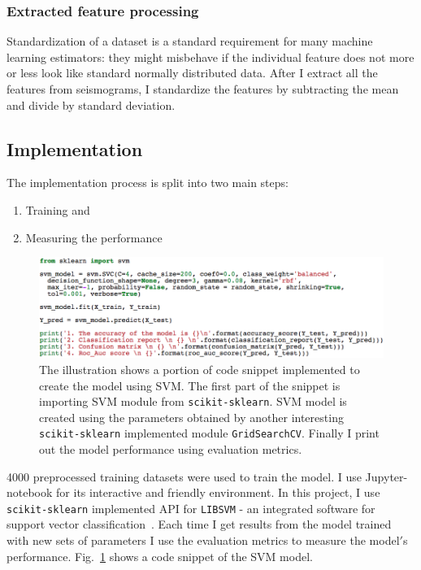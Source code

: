 \documentclass[12pt]{article}
\begin{document}
        \subsubsection{Extracted feature processing}
        Standardization of a dataset is a standard requirement for many machine learning estimators: they might misbehave if the individual feature does not more or less look like standard normally distributed data. After I extract all the features from seismograms, I standardize the features by subtracting the mean and divide by standard deviation.
        
        \subsection{Implementation}
        The implementation process is split into two main steps:
        \begin{enumerate}
            \item Training and 
            \item Measuring the performance
        \end{enumerate}
    
        \begin{figure}[!htb]
            \begin{center}
            \includegraphics[scale=0.5]{figures/svm_code_snippet.png}
            \end{center}
            \caption{The illustration shows a portion of code snippet implemented to create the model using SVM. The first part of the snippet is importing SVM module from \texttt{scikit-sklearn}. SVM model is created using the parameters obtained by another interesting \texttt{scikit-sklearn} implemented module \texttt{GridSearchCV}. Finally I print out the model performance using evaluation metrics.}
            \label{fig:svm_code_snippet}
        \end{figure}
    
         
        4000 preprocessed training datasets were used to train the model. I use Jupyter-notebook for its interactive and friendly environment. In this project, I use \texttt{scikit-sklearn} implemented API for \texttt{LIBSVM} - an integrated software for support vector classification~\citep{scholkopf2000new}. Each time I get results from the model trained with new sets of parameters I use the evaluation metrics to measure the model$'$s performance. Fig.~\ref{fig:svm_code_snippet} shows a code snippet of the SVM model.
        
\end{document}
